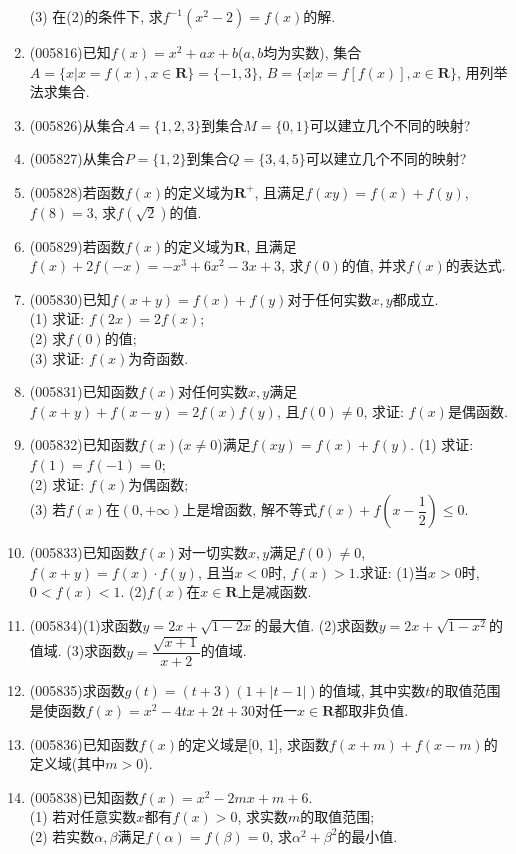 \documentclass[10pt,a4paper]{article}
\begin{document}
\begin{enumerate}[1.]
(3) 在(2)的条件下, 求$f^{-1}(x^2-2)=f(x)$的解.
\item {\tiny (005816)}已知$f(x)=x^2+ax+b$($a,b$均为实数), 集合$A=\{x|x=f(x) ,x\in \mathbf{R}\}=\{-1,3\}$, $B=\{x|x=f[f(x)],x\in \mathbf{R}\}$, 用列举法求集合.
\item {\tiny (005826)}从集合$A=\{1,2,3\}$到集合$M=\{0,1\}$可以建立几个不同的映射?
\item {\tiny (005827)}从集合$P=\{1,2\}$到集合$Q=\{3,4,5\}$可以建立几个不同的映射?
\item {\tiny (005828)}若函数$f(x)$的定义域为$\mathbf{R}^+$, 且满足$f(xy)=f(x)+f(y)$, $f(8)=3$, 求$f(\sqrt 2)$的值.
\item {\tiny (005829)}若函数$f(x)$的定义域为$\mathbf{R}$, 且满足$f(x)+2f(-x)=-x^3+6x^2-3x+3$, 求$f(0)$的值, 并求$f(x)$的表达式.
\item {\tiny (005830)}已知$f(x+y)=f(x)+f(y)$对于任何实数$x,y$都成立.\\
(1) 求证: $f(2x)=2f(x)$;\\
(2) 求$f(0)$的值;\\
(3) 求证: $f(x)$为奇函数.
\item {\tiny (005831)}已知函数$f(x)$对任何实数$x,y$满足$f(x+y)+f(x-y)=2f(x)f(y)$, 且$f(0)\ne 0$, 求证: $f(x)$是偶函数.
\item {\tiny (005832)}已知函数$f(x)$($x\ne 0$)满足$f(xy)=f(x)+f(y)$.
(1) 求证: $f(1)=f(-1)=0$;\\
(2) 求证: $f(x)$为偶函数;\\
(3) 若$f(x)$在$(0,+\infty)$上是增函数, 解不等式$f(x)+f(x-\dfrac 12)\le 0$.
\item {\tiny (005833)}已知函数$f(x)$对一切实数$x,y$满足$f(0)\ne 0$, $f(x+y)=f(x)\cdot f(y)$, 且当$x<0$时, $f(x)>1$.求证:
(1)当$x>0$时, $0<f(x)<1$.
(2)$f(x)$在$x\in \mathbf{R}$上是减函数.
\item {\tiny (005834)}(1)求函数$y=2x+\sqrt {1-2x}$的最大值.
(2)求函数$y=2x+\sqrt {1-x^2}$的值域.
(3)求函数$y=\dfrac{\sqrt {x+1}}{x+2}$的值域.
\item {\tiny (005835)}求函数$g(t)=(t+3)(1+|t-1|)$的值域, 其中实数$t$的取值范围是使函数$f(x)=x^2-4tx+2t+30$对任一$x\in \mathbf{R}$都取非负值.
\item {\tiny (005836)}已知函数$f(x)$的定义域是[0, 1], 求函数$f(x+m)+f(x-m)$的定义域(其中$m>0$).
\item {\tiny (005838)}已知函数$f(x)=x^2-2mx+m+6$.\\
(1) 若对任意实数$x$都有$f(x)>0$, 求实数$m$的取值范围;\\
(2) 若实数$\alpha ,\beta$满足$f(\alpha)=f(\beta)=0$, 求$\alpha ^2+\beta ^2$的最小值.

\end{enumerate}
\end{document}
